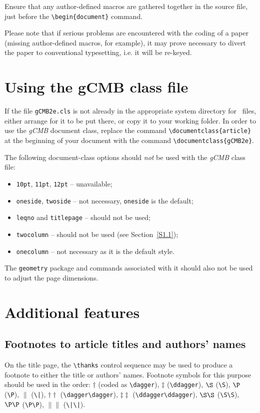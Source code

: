 \documentclass{gCMB2e}
\begin{document}
Ensure that any author-defined macros are gathered together in the source file, just before the
\verb"\begin{document}" command.

Please note that if serious problems are encountered with the coding of a paper (missing author-defined macros,
for example), it may prove necessary to divert the paper to conventional typesetting, i.e. it will be re-keyed.


\section{Using the {\bi gCMB} class file}

If the file {\tt gCMB2e.cls} is not already in the appropriate system directory for \LaTeXe\ files, either
arrange for it to be put there, or copy it to your working folder. In order to use the {\it gCMB} document class, replace the command
\verb"\documentclass{article}" at the beginning of your document with the command \verb"\documentclass{gCMB2e}".

The following document-class options should \emph{not} be used with the {\it gCMB} class file:
%
\begin{itemize}
  \item {\tt 10pt}, {\tt 11pt}, {\tt 12pt} -- unavailable;
  \item {\tt oneside}, {\tt twoside} -- not necessary, \texttt{oneside} is the default;
  \item {\tt leqno} and {\tt titlepage} -- should not be used;
  \item {\tt twocolumn} -- should not be used (see Section~\ref{S1.1});
  \item \texttt{onecolumn} -- not necessary as it is the default style.
\end{itemize}
%
The {\tt geometry} package and commands associated with it should also not be used to adjust the page dimensions.


\section{Additional features}

\subsection{Footnotes to article titles and authors' names}

On the title page, the \verb"\thanks" control sequence may be used to produce a footnote to either the title or authors' names.
Footnote symbols for this purpose should be used in the order: $\dagger$ (coded as \verb"\dagger"),
$\ddagger$ (\verb"\ddagger"), $\S$ (\verb"\S"), $\P$ (\verb"\P"), $\|$ (\verb"\|"), $\dagger\dagger$ (\verb"\dagger\dagger"), $\ddagger\ddagger$ (\verb"\ddagger\ddagger"), $\S\S$ (\verb"\S\S"),
$\P\P$ (\verb"\P\P"), $\|\|$ (\verb"\|\|").
\end{document}
